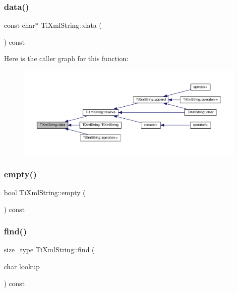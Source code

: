 \subsubsection{\texorpdfstring{data()}{data()}}
{\footnotesize\ttfamily const char$\ast$ Ti\+Xml\+String\+::data (\begin{DoxyParamCaption}{ }\end{DoxyParamCaption}) const\hspace{0.3cm}{\ttfamily [inline]}}

Here is the caller graph for this function\+:\nopagebreak
\begin{figure}[H]
\begin{center}
\leavevmode
\includegraphics[width=350pt]{class_ti_xml_string_a0e010e1737cfc3ee885b42875171b88e_icgraph}
\end{center}
\end{figure}
\mbox{\label{class_ti_xml_string_a3139aafb0f0a8e26d1a4ed58a50f3678}} 
\subsubsection{\texorpdfstring{empty()}{empty()}}
{\footnotesize\ttfamily bool Ti\+Xml\+String\+::empty (\begin{DoxyParamCaption}{ }\end{DoxyParamCaption}) const\hspace{0.3cm}{\ttfamily [inline]}}

\mbox{\label{class_ti_xml_string_a22fc54a23c5a0ab771331a25a769516e}} 
\subsubsection{\texorpdfstring{find()}{find()}\hspace{0.1cm}{\footnotesize\ttfamily [1/2]}}
{\footnotesize\ttfamily \hyperlink{class_ti_xml_string_abeb2c1893a04c17904f7c06546d0b971}{size\+\_\+type} Ti\+Xml\+String\+::find (\begin{DoxyParamCaption}\item[{char}]{lookup }\end{DoxyParamCaption}) const\hspace{0.3cm}{\ttfamily [inline]}}

